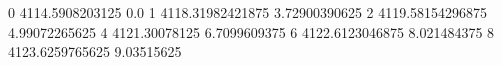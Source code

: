 0 4114.5908203125 0.0
1 4118.31982421875 3.72900390625
2 4119.58154296875 4.99072265625
4 4121.30078125 6.7099609375
6 4122.6123046875 8.021484375
8 4123.6259765625 9.03515625
